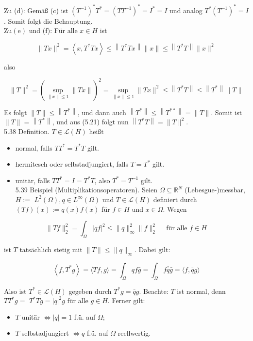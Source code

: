 \documentclass[10pt, letterpaper]{article}
\begin{document}
Zu (d): Gemäß (c) ist $\left(T^{-1}\right)^{*} T^{*}=\left(T T^{-1}\right)^{*}=I^{*}=I$ und analog $T^{*}\left(T^{-1}\right)^{*}=I$. Somit folgt die Behauptung.\\
$\mathrm{Zu}(\mathrm{e})$ und (f): Für alle $x \in H$ ist

$$
\|T x\|^{2}=\left\langle x, T^{*} T x\right\rangle \leq\left\|T^{*} T x\right\|\|x\| \leq\left\|T^{*} T\right\|\|x\|^{2}
$$

also

$$
\|T\|^{2}=\left(\sup _{\|x\| \leq 1}\|T x\|\right)^{2}=\sup _{\|x\| \leq 1}\|T x\|^{2} \leq\left\|T^{*} T\right\| \leq\left\|T^{*}\right\|\|T\|
$$

Es folgt $\|T\| \leq\left\|T^{*}\right\|$, und dann auch $\left\|T^{*}\right\| \leq\left\|T^{* *}\right\|=\|T\|$. Somit ist $\|T\|=\left\|T^{*}\right\|$, und aus (5.21) folgt nun $\left\|T^{*} T\right\|=\|T\|^{2}$.\\
5.38 Definition. $T \in \mathcal{L}(H)$ heißt

\begin{itemize}
  \item normal, falls $T T^{*}=T^{*} T$ gilt.
  \item hermitesch oder selbstadjungiert, falls $T=T^{*}$ gilt.
  \item unitär, falls $T T^{*}=I=T^{*} T$, also $T^{*}=T^{-1}$ gilt.\\
5.39 Beispiel (Multiplikationsoperatoren). Seien $\Omega \subseteq \mathbb{R}^{N}$ (Lebesgue-)messbar, $H:=$ $L^{2}(\Omega), q \in L^{\infty}(\Omega)$ und $T \in \mathcal{L}(H)$ definiert durch $(T f)(x):=q(x) f(x)$ für $f \in H$ und $x \in \Omega$. Wegen
\end{itemize}

$$
\|T f\|_{2}^{2}=\int_{\Omega}|q f|^{2} \leq\|q\|_{\infty}^{2}\|f\|_{2}^{2} \quad \text { für alle } f \in H
$$

ist $T$ tatsächlich stetig mit $\|T\| \leq\|q\|_{\infty}$. Dabei gilt:

$$
\left\langle f, T^{*} g\right\rangle=\langle T f, g\rangle=\int_{\Omega} q f \bar{g}=\int_{\Omega} f \overline{\bar{q}} \bar{g}=\langle f, \bar{q} g\rangle
$$

Also ist $T^{*} \in \mathcal{L}(H)$ gegeben durch $T^{*} g=\bar{q} g$. Beachte: $T$ ist normal, denn $T T^{*} g=$ $T^{*} T g=|q|^{2} g$ für alle $g \in H$. Ferner gilt:

\begin{itemize}
  \item $T$ unitär $\Longleftrightarrow|q|=1$ f.ü. auf $\Omega$;
  \item $T$ selbstadjungiert $\Longleftrightarrow q$ f.ü. auf $\Omega$ reellwertig.
\end{itemize}
\end{document}
